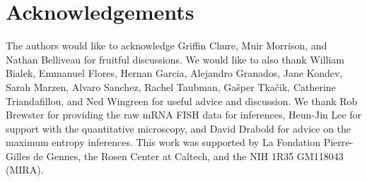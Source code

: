\section*{Acknowledgements}

The authors would like to acknowledge Griffin Chure, Muir Morrison, and Nathan
Belliveau for fruitful discussions. We would like to also thank William Bialek,
Emmanuel Flores, Hernan Garcia, Alejandro Granados, Jane Kondev, Sarah Marzen,
Alvaro Sanchez, Rachel Taubman, Gašper Tkačik, Catherine Triandafillou, and Ned
Wingreen for useful advice and discussion. We thank Rob Brewster for providing
the raw mRNA FISH data for inferences, Heun-Jin Lee for support with the
quantitative microscopy, and David Drabold for advice on the maximum entropy
inferences. This work was supported by La Fondation Pierre-Gilles de Gennes, the
Rosen Center at Caltech, and the NIH 1R35 GM118043 (MIRA).  
